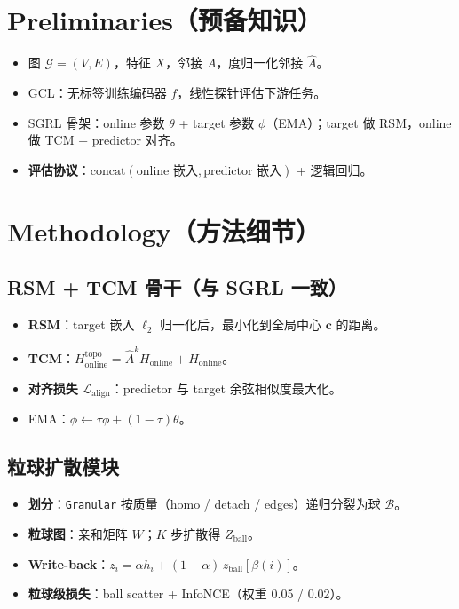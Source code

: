 \documentclass[11pt,a4paper]{article}
\begin{document}
\section{Preliminaries（预备知识）}

\begin{itemize}
  \item 图 $\mathcal{G}=(V,E)$，特征 $X$，邻接 $A$，度归一化邻接 $\hat{A}$。
  \item GCL：无标签训练编码器 $f$，线性探针评估下游任务。
  \item SGRL 骨架：online 参数 $\theta$ + target 参数 $\phi$（EMA）；target 做 RSM，online 做 TCM + predictor 对齐。
  \item \textbf{评估协议}：$\mathrm{concat}(\text{online 嵌入}, \text{predictor 嵌入})$ + 逻辑回归。
\end{itemize}

\section{Methodology（方法细节）}

\subsection{RSM + TCM 骨干（与 SGRL 一致）}
\begin{itemize}
  \item \textbf{RSM}：target 嵌入 $\ell_2$ 归一化后，最小化到全局中心 $\mathbf{c}$ 的距离。
  \item \textbf{TCM}：$H_{\mathrm{online}}^{\mathrm{topo}} = \hat{A}^k H_{\mathrm{online}} + H_{\mathrm{online}}$。
  \item \textbf{对齐损失} $\mathcal{L}_{\mathrm{align}}$：predictor 与 target 余弦相似度最大化。
  \item EMA：$\phi \leftarrow \tau\phi + (1-\tau)\theta$。
\end{itemize}

\subsection{粒球扩散模块}
\begin{itemize}
  \item \textbf{划分}：\texttt{Granular} 按质量（homo / detach / edges）递归分裂为球 $\mathcal{B}$。
  \item \textbf{粒球图}：亲和矩阵 $W$；$K$ 步扩散得 $Z_{\mathrm{ball}}$。
  \item \textbf{Write-back}：$z_i = \alpha h_i + (1-\alpha)\, z_{\mathrm{ball}}[\beta(i)]$。
  \item \textbf{粒球级损失}：ball scatter + InfoNCE（权重 0.05 / 0.02）。
\end{itemize}
\end{document}
